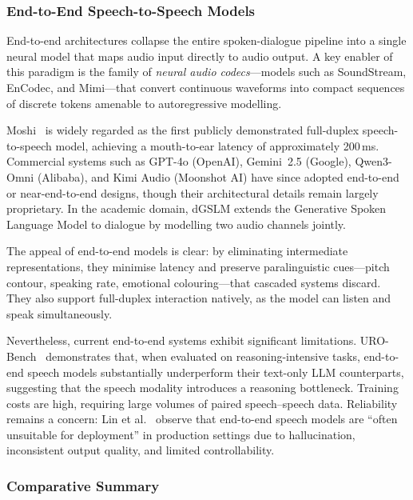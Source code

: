 \subsubsection{End-to-End Speech-to-Speech Models}
\label{sssec:e2e}

End-to-end architectures collapse the entire spoken-dialogue pipeline into a
single neural model that maps audio input directly to audio output.  A key
enabler of this paradigm is the family of \emph{neural audio codecs}---models
such as SoundStream, EnCodec, and Mimi---that convert continuous waveforms into
compact sequences of discrete tokens amenable to autoregressive modelling.

Moshi~\cite{defossez2024moshi} is widely regarded as the first publicly
demonstrated full-duplex speech-to-speech model, achieving a mouth-to-ear
latency of approximately 200\,ms.  Commercial systems such as GPT-4o
(OpenAI), Gemini~2.5 (Google), Qwen3-Omni (Alibaba), and Kimi Audio
(Moonshot AI) have since adopted end-to-end or near-end-to-end designs, though
their architectural details remain largely proprietary.  In the academic domain,
dGSLM extends the Generative Spoken Language Model to dialogue by modelling two
audio channels jointly.

The appeal of end-to-end models is clear: by eliminating intermediate
representations, they minimise latency and preserve paralinguistic cues---pitch
contour, speaking rate, emotional colouring---that cascaded systems discard.
They also support full-duplex interaction natively, as the model can listen and
speak simultaneously.

Nevertheless, current end-to-end systems exhibit significant limitations.
URO-Bench~\cite{chen2025urobench} demonstrates that, when evaluated on
reasoning-intensive tasks, end-to-end speech models substantially underperform
their text-only LLM counterparts, suggesting that the speech modality introduces
a reasoning bottleneck.  Training costs are high, requiring large volumes of
paired speech--speech data.  Reliability remains a concern: Lin et
al.~\cite{lin2025xtalk} observe that end-to-end speech models are ``often
unsuitable for deployment'' in production settings due to hallucination,
inconsistent output quality, and limited controllability.

\subsubsection{Comparative Summary}
\label{sssec:arch-comparison}

